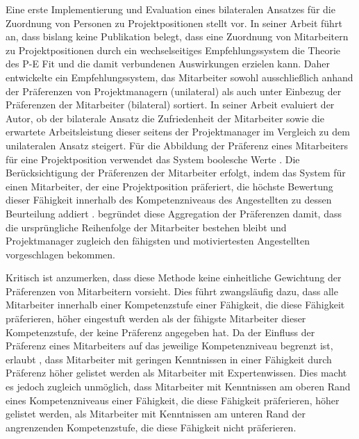 Eine erste Implementierung und Evaluation eines bilateralen Ansatzes für die Zuordnung von Personen zu Projektpositionen stellt \textcite[S. 1ff.]{link:booklet} vor.
In seiner Arbeit führt \textcite[S. 2]{link:booklet} an, dass bislang keine Publikation belegt, dass eine Zuordnung von Mitarbeitern zu Projektpositionen durch ein wechselseitiges Empfehlungssystem die Theorie des \ac{P-E Fit} und die damit verbundenen Auswirkungen erzielen kann.
Daher entwickelte \textcite[S. 1ff.]{link:booklet} ein Empfehlungssystem, das Mitarbeiter sowohl ausschließlich anhand der Präferenzen von Projektmanagern (unilateral) als auch unter Einbezug der Präferenzen der Mitarbeiter (bilateral) sortiert.
In seiner Arbeit evaluiert der Autor, ob der bilaterale Ansatz die Zufriedenheit der Mitarbeiter sowie die erwartete Arbeitsleistung dieser seitens der Projektmanager im Vergleich zu dem unilateralen Ansatz steigert.
Für die Abbildung der Präferenz eines Mitarbeiters für eine Projektposition verwendet das System boolesche Werte \cite[S. 69]{link:booklet}.
Die Berücksichtigung der Präferenzen der Mitarbeiter erfolgt, indem das System für einen Mitarbeiter, der eine Projektposition präferiert, die höchste Bewertung dieser Fähigkeit innerhalb des Kompetenzniveaus des Angestellten zu dessen Beurteilung addiert \cite[S. 44]{link:booklet}.
\textcite[S. 44]{link:booklet} begründet diese Aggregation der Präferenzen damit, dass die ursprüngliche Reihenfolge der Mitarbeiter bestehen bleibt und Projektmanager zugleich den fähigsten und motiviertesten Angestellten vorgeschlagen bekommen.

Kritisch ist anzumerken, dass diese Methode keine einheitliche Gewichtung der Präferenzen von Mitarbeitern vorsieht.
Dies führt zwangsläufig dazu, dass alle Mitarbeiter innerhalb einer Kompetenzstufe einer Fähigkeit, die diese Fähigkeit präferieren, höher eingestuft werden als der fähigste Mitarbeiter dieser Kompetenzstufe, der keine Präferenz angegeben hat.
Da der Einfluss der Präferenz eines Mitarbeiters auf das jeweilige Kompetenzniveau begrenzt ist, erlaubt \textcite[S. 1ff.]{link:booklet}, dass Mitarbeiter mit geringen Kenntnissen in einer Fähigkeit durch Präferenz höher gelistet werden als Mitarbeiter mit Expertenwissen.
Dies macht es jedoch zugleich unmöglich, dass Mitarbeiter mit Kenntnissen am oberen Rand eines Kompetenzniveaus einer Fähigkeit, die diese Fähigkeit präferieren, höher gelistet werden, als Mitarbeiter mit Kenntnissen am unteren Rand der angrenzenden Kompetenzstufe, die diese Fähigkeit nicht präferieren.

